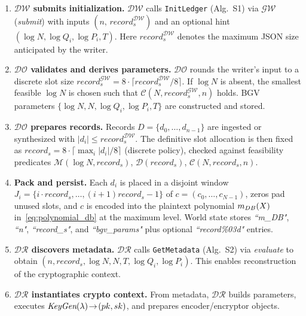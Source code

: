 \documentclass{ieeetj}
\begin{document}
\begin{enumerate}
    \item \textbf{$\mathcal{DW}$ submits initialization.}  
    $\mathcal{DW}$ calls \texttt{InitLedger} (Alg.~S1) via $\mathcal{GW}$ (\emph{submit}) 
    with inputs $(n,\,record_{s}^{\mathcal{DW}})$ and an optional hint $(\log N,\log Q_i,\log P_i,T)$. 
    Here $record_{s}^{\mathcal{DW}}$ denotes the maximum JSON size anticipated by the writer. 

    \item \textbf{$\mathcal{DO}$ validates and derives parameters.}  
    $\mathcal{DO}$ rounds the writer’s input to a discrete slot size 
    $record_{s}^{\mathcal{GW}} = 8 \cdot \lceil record_{s}^{\mathcal{DW}} / 8 \rceil$. 
    If $\log N$ is absent, the smallest feasible $\log N$ is chosen such that 
    $\mathcal{C}(N,record_{s}^{\mathcal{GW}},n)$ holds. 
    BGV parameters $\{\log N,N,\log Q_i,\log P_i,T\}$ are constructed and stored.

    \item \textbf{$\mathcal{DO}$ prepares records.}  
    Records $D=\{d_0,\dots,d_{n-1}\}$ are ingested or synthesized with $|d_i|\le record_{s}^{\mathcal{DW}}$. 
    The definitive slot allocation is then fixed as 
    $record_s = 8 \cdot \lceil \max_i |d_i| / 8 \rceil$ (discrete policy), 
    checked against feasibility predicates 
    $\mathcal{M}(\log N,record_s)$, $\mathcal{D}(record_s)$, $\mathcal{C}(N,record_s,n)$. 

    \item \textbf{Pack and persist.}  
    Each $d_i$ is placed in a disjoint window $J_i=\{i\cdot record_s,\dots,(i+1)record_s-1\}$ of $c=(c_0,\dots,c_{N-1})$, 
    zeros pad unused slots, and $c$ is encoded into the plaintext polynomial $\emph{$m_{DB}$}(X)$ in~\eqref{eq:polynomial_db} at the maximum level.
    World state stores \emph{``m\_DB"}, \emph{``n"}, \emph{``record\_s"}, and \emph{``bgv\_params"} 
    plus optional \emph{``record\%03d"} entries. 
    
    \item \textbf{$\mathcal{DR}$ discovers metadata.}  
    $\mathcal{DR}$ calls \texttt{GetMetadata} (Alg.~S2) via \emph{evaluate} 
    to obtain $(n,record_s,\log N,N,T,\log Q_i,\log P_i)$. 
    This enables reconstruction of the cryptographic context. 

    \item \textbf{$\mathcal{DR}$ instantiates crypto context.}  
    From metadata, $\mathcal{DR}$ builds parameters, executes $\emph{KeyGen}(\lambda)\!\to\!(pk,sk)$, 
    and prepares encoder/encryptor objects. 


\end{enumerate}
\end{document}
